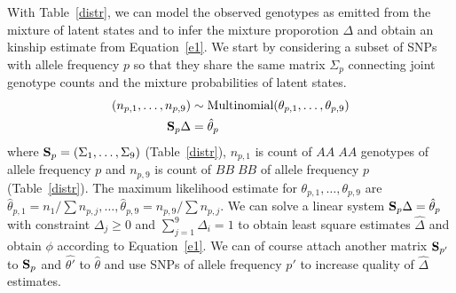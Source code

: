 \documentclass[11pt,Times]{article}
\begin{document}
\vspace{.2in} 
With Table~\ref{distr}, we can model the observed genotypes as emitted from the mixture of latent states and to infer the mixture proporotion $\Delta$ and obtain an kinship estimate from Equation~\eqref{e1}. We start by considering a subset of SNPs with allele frequency $p$ so that they share the same matrix $\Sigma_p$ connecting joint genotype counts and the mixture probabilities of latent states. 
\begin{align}
(n_{p,1}, \dots, n_{p,9}) &\sim \mbox{Multinomial}(\theta_{p,1}, \dots, \theta_{p,9}) \label{mn}\\
\S_p \Delta  &= \hat\theta_p \label{lse}
\end{align}
where $\S_p = (\Sigma_1, \dots, \Sigma_9)$ (Table~\ref{distr}), $n_{p,1}$ is count of $AA\;AA$ genotypes of allele frequency $p$ and $n_{p,9}$ is count of $BB\;BB$ of allele frequency $p$ (Table~\ref{distr}). The maximum likelihood estimate for $\theta_{p,1}, \dots,  \theta_{p,9}$ are $\hat{\theta}_{p,1}=n_1/\sum{n_{p,j}}, \dots, \hat{\theta}_{p,9} = n_{p,9}/\sum{n_{p,j}}$.  
We can solve a linear system $\S_p \Delta = \hat\theta_p$ with constraint $\Delta_j \ge 0$ and $\sum_{j=1}^9\Delta_i = 1$ to obtain least square estimates $\hat{\Delta}$ and obtain $\phi$ according to Equation~\eqref{e1}. 
We can of course attach another matrix $\S_{p'}$ to $\S_p$ and $\hat{\theta'}$ to $\hat{\theta}$ and use SNPs of allele frequency $p'$ to increase quality of $\hat{\Delta}$ estimates. 
\end{document}

